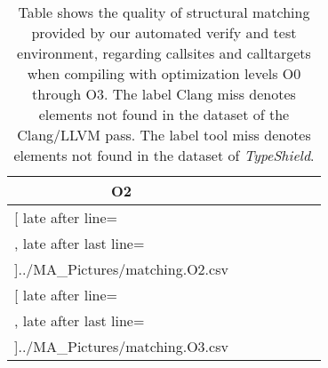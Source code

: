 \begin{table}
\begin{tabular}{l|c|c|c|c|c|c}
	\multicolumn{1}{c}{\bfseries O2}%
	\\\midrule
	\csvreader[ late after line=\\, late after last line=\\\midrule]{../MA_Pictures/matching.O2.csv}{
	}
	{\csvcoli & \csvcoliii & \csvcoliv & \csvcolv & \csvcolix & \csvcolx & \csvcolxi }%
%
%

	\multicolumn{1}{c}{\bfseries O3 }%
	\\\midrule
	\csvreader[ late after line=\\, late after last line=\\\bottomrule]{../MA_Pictures/matching.O3.csv}{
	}
	{\csvcoli & \csvcoliii & \csvcoliv & \csvcolv & \csvcolix & \csvcolx & \csvcolxi }%
    	\end{tabular}
	\caption {Table shows the quality of structural matching provided by our automated verify and test environment, regarding callsites and calltargets when compiling with optimization levels O0 through O3. The label Clang miss denotes elements not found in the dataset of the Clang/LLVM pass. The label tool miss denotes elements not found in the dataset of \textit{TypeShield}.}
	\label{tbl:matchingquality}
\end{table}



